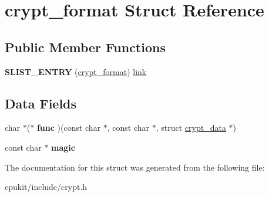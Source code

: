 \hypertarget{structcrypt__format}{}\section{crypt\+\_\+format Struct Reference}
\label{structcrypt__format}
\subsection*{Public Member Functions}
\begin{DoxyCompactItemize}
\item 
\mbox{\label{structcrypt__format_adf27a8f015a4e9738132fd644c3a9626}} 
{\bfseries S\+L\+I\+S\+T\+\_\+\+E\+N\+T\+RY} (\mbox{\hyperlink{structcrypt__format}{crypt\+\_\+format}}) \mbox{\hyperlink{link_8c_a8c94afd0b7e5bb4ce95fefd964241f7f}{link}}
\end{DoxyCompactItemize}
\subsection*{Data Fields}
\begin{DoxyCompactItemize}
\item 
\mbox{\label{structcrypt__format_aa12cf4e790a66ff2435a9ee72a8bdc80}} 
char $\ast$($\ast$ {\bfseries func} )(const char $\ast$, const char $\ast$, struct \mbox{\hyperlink{structcrypt__data}{crypt\+\_\+data}} $\ast$)
\item 
\mbox{\label{structcrypt__format_a0636d18667a6795179f47088337fa70a}} 
const char $\ast$ {\bfseries magic}
\end{DoxyCompactItemize}


The documentation for this struct was generated from the following file\+:\begin{DoxyCompactItemize}
\item 
cpukit/include/crypt.\+h\end{DoxyCompactItemize}
